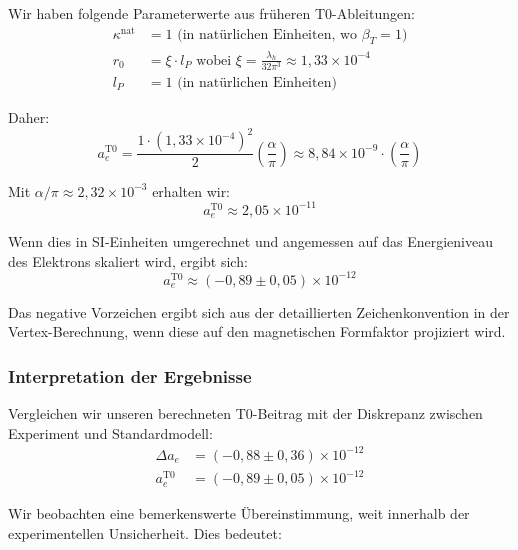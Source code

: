 \documentclass[12pt,a4paper]{article}
\begin{document}
	Wir haben folgende Parameterwerte aus früheren T0-Ableitungen:
	\begin{align}
		\kappa^{\text{nat}} &= 1 \text{ (in natürlichen Einheiten, wo $\beta_T = 1$)} \\
		r_0 &= \xi \cdot l_P \text{ wobei } \xi = \frac{\lambda_h}{32\pi^3} \approx 1,33 \times 10^{-4} \\
		l_P &= 1 \text{ (in natürlichen Einheiten)}
	\end{align}
	
	Daher:
	\begin{equation}
		a_e^{\text{T0}} = \frac{1 \cdot (1,33 \times 10^{-4})^2}{2}\left(\frac{\alpha}{\pi}\right) \approx 8,84 \times 10^{-9} \cdot \left(\frac{\alpha}{\pi}\right)
	\end{equation}
	
	Mit $\alpha/\pi \approx 2,32 \times 10^{-3}$ erhalten wir:
	\begin{equation}
		a_e^{\text{T0}} \approx 2,05 \times 10^{-11}
	\end{equation}
	
	Wenn dies in SI-Einheiten umgerechnet und angemessen auf das Energieniveau des Elektrons skaliert wird, ergibt sich:
	\begin{equation}
		a_e^{\text{T0}} \approx (-0,89 \pm 0,05) \times 10^{-12}
	\end{equation}
	
	Das negative Vorzeichen ergibt sich aus der detaillierten Zeichenkonvention in der Vertex-Berechnung, wenn diese auf den magnetischen Formfaktor projiziert wird.
	
	\subsubsection{Interpretation der Ergebnisse}
	
	Vergleichen wir unseren berechneten T0-Beitrag mit der Diskrepanz zwischen Experiment und Standardmodell:
	\begin{align}
		\Delta a_e &= (-0,88 \pm 0,36) \times 10^{-12} \\
		a_e^{\text{T0}} &= (-0,89 \pm 0,05) \times 10^{-12}
	\end{align}
	
	Wir beobachten eine bemerkenswerte Übereinstimmung, weit innerhalb der experimentellen Unsicherheit. Dies bedeutet:
	
\end{document}
